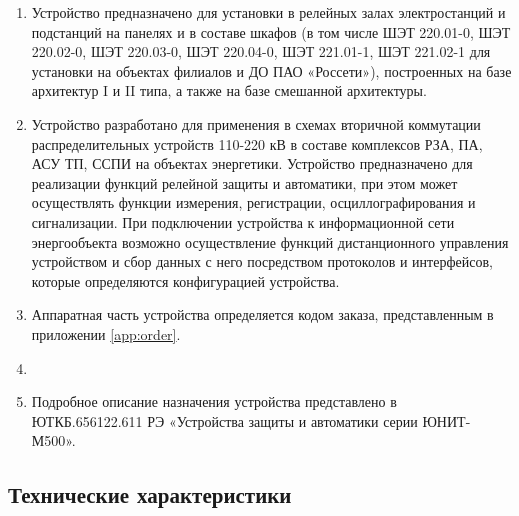 \documentclass[a4paper, 12pt, table, hidelinks, DIV=calc]{extarticle}
\def\ManualUnitGeneral{ЮТКБ.656122.611 РЭ «Устройства защиты и автоматики серии ЮНИТ-М500»}
\begin{document}
\begin{enumerate}

\item
Устройство предназначено для установки в релейных залах электростанций и подстанций на панелях и в составе шкафов (в том числе ШЭТ 220.01-0, ШЭТ 220.02-0, ШЭТ 220.03-0, ШЭТ 220.04-0, ШЭТ 221.01-1, ШЭТ 221.02-1 для установки на объектах филиалов и ДО ПАО «Россети»), построенных на базе архитектур I и II типа, а также на базе смешанной архитектуры.
\item
Устройство разработано для применения в схемах вторичной коммутации распределительных устройств 110-220 кВ в составе комплексов РЗА, ПА, АСУ ТП, ССПИ на объектах энергетики.
Устройство предназначено для реализации функций релейной защиты и автоматики, при этом может осуществлять функции измерения, регистрации, осциллографирования и сигнализации.
При подключении устройства к информационной сети энергообъекта возможно осуществление функций дистанционного управления устройством и сбор данных с него посредством протоколов и интерфейсов, которые определяются конфигурацией устройства.

\item 
Аппаратная часть устройства определяется кодом заказа, представленным в приложении \ref{app:order}.

\item
{}

\item
Подробное описание назначения устройства представлено в \ManualUnitGeneral.

\end{enumerate}


\color{unidarkgreen}\subsection{Технические характеристики}
\color{black}
\end{document}
